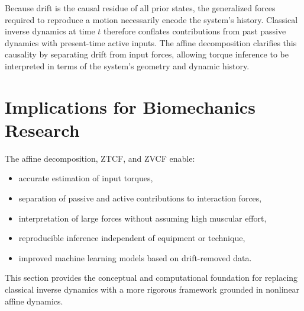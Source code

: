 \documentclass[12pt]{article}
\begin{document}
Because drift is the causal residue of all prior states, the generalized forces required to reproduce a motion necessarily encode the system's history. Classical inverse dynamics at time $t$ therefore conflates contributions from past passive dynamics with present-time active inputs. The affine decomposition clarifies this causality by separating drift from input forces, allowing torque inference to be interpreted in terms of the system's geometry and dynamic history.

\section{Implications for Biomechanics Research}

The affine decomposition, ZTCF, and ZVCF enable:
\begin{itemize}
\item accurate estimation of input torques,
\item separation of passive and active contributions to interaction forces,
\item interpretation of large forces without assuming high muscular effort,
\item reproducible inference independent of equipment or technique,
\item improved machine learning models based on drift-removed data.
\end{itemize}
This section provides the conceptual and computational foundation for replacing classical inverse dynamics with a more rigorous framework grounded in nonlinear affine dynamics.
\end{document}
